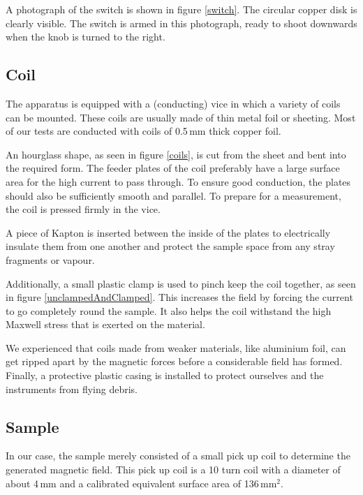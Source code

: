 
A photograph of the switch is shown in figure \ref{switch}. The circular 
copper disk is clearly visible. The switch is armed in this photograph, 
ready to shoot downwards when the knob is turned to the right.


\subsection{Coil}
The apparatus is equipped with a (conducting) vice in which a variety of 
coils can be mounted. These coils are usually made of thin metal foil or 
sheeting.  Most of our tests are conducted with coils of 0.5\,mm thick 
copper foil.


An hourglass shape, as seen in figure \ref{coils}, is cut from the sheet 
and bent into the required form.  The feeder plates of the coil preferably 
have a large surface area for the high current to pass through. To ensure 
good conduction, the plates should also be sufficiently smooth and 
parallel. To prepare for a measurement, the coil is pressed firmly in the 
vice.

A piece of Kapton is inserted between the inside of the plates to 
electrically insulate them from one another and protect the sample space 
from any stray fragments or vapour.


Additionally, a small plastic clamp is used to pinch keep the coil 
together, as seen in figure \ref{unclampedAndClamped}. This increases the 
field by forcing the current to go completely round the sample. It also 
helps the coil withstand the high Maxwell stress that is exerted on the 
material.

We experienced that coils made from weaker materials, like aluminium foil, 
can get ripped apart by the magnetic forces before a considerable field has 
formed.  Finally, a protective plastic casing is installed to protect 
ourselves and the instruments from flying debris.

\subsection{Sample}
In our case, the sample merely consisted of a small pick up coil to 
determine the generated magnetic field. This pick up coil is a 10 turn coil 
with a diameter of about 4\,mm and a calibrated equivalent surface area of 
136\,mm$^2$.

